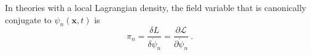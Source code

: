 \documentclass[11pt,a4paper]{article}
\renewcommand{\vec}[1]{\boldsymbol{#1}}
\newcounter{theo}[section]\setcounter{theo}{0}
\begin{document}
In theories with a local Lagrangian density, the field variable that is canonically conjugate to $\psi_n(\vec{x}, t)$ is
\begin{equation}
\pi_n = \dfrac{\delta L}{\delta \dot{\psi}_n} = \dfrac{\partial \mathcal L}{\partial \dot{\psi}_n} ~.
\end{equation}































































































\end{document}
